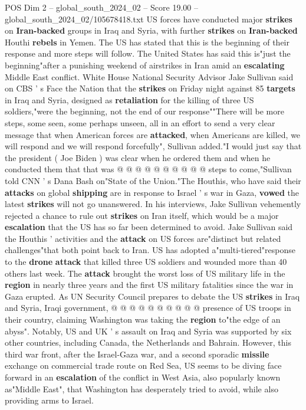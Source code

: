 \begin{textsample}{POS Dim 2 – global\_south\_2024\_02 – Score 19.00 – global\_south\_2024\_02/105678418.txt}  \label{ex:f2_pos_195}
US forces have conducted major \textbf{strikes} on \textbf{Iran-backed} groups in Iraq and Syria, with further \textbf{strikes} on \textbf{Iran-backed} Houthi \textbf{rebels} in Yemen.
The US has stated that this is the beginning of their response and more steps will follow.
The United States has said this is"just the beginning"after a punishing weekend of airstrikes in Iran amid an \textbf{escalating} Middle East conflict.
White House National Security Advisor Jake Sullivan said on CBS ' s Face the Nation that the \textbf{strikes} on Friday night against 85 \textbf{targets} in Iraq and Syria, designed as \textbf{retaliation} for the killing of three US soldiers,"were the beginning, not the end of our response""There will be more steps, some seen, some perhaps unseen, all in an effort to send a very clear message that when American forces are \textbf{attacked}, when Americans are killed, we will respond and we will respond forcefully", Sullivan added."I would just say that the president ( Joe Biden ) was clear when he ordered them and when he conducted them that that was @ @ @ @ @ @ @ @ @ @ steps to come,"Sullivan told CNN ' s Dana Bash on"State of the Union."The Houthis, who have said their \textbf{attacks} on global \textbf{shipping} are in response to Israel ' s war in Gaza, \textbf{vowed} the latest \textbf{strikes} will not go unanswered.
In his interviews, Jake Sullivan vehemently rejected a chance to rule out \textbf{strikes} on Iran itself, which would be a major \textbf{escalation} that the US has so far been determined to avoid.
Jake Sullivan said the Houthis ' activities and the \textbf{attack} on US forces are"distinct but related challenges"that both point back to Iran.
US has adopted a"multi-tiered"response to the \textbf{drone} \textbf{attack} that killed three US soldiers and wounded more than 40 others last week.
The \textbf{attack} brought the worst loss of US military life in the \textbf{region} in nearly three years and the first US military fatalities since the war in Gaza erupted.
As UN Security Council prepares to debate the US \textbf{strikes} in Iraq and Syria, Iraqi government, @ @ @ @ @ @ @ @ @ @ presence of US troops in their country, claiming Washington was taking the \textbf{region} to"the edge of an abyss".
Notably, US and UK ' s assault on Iraq and Syria was supported by six other countries, including Canada, the Netherlands and Bahrain.
However, this third war front, after the Israel-Gaza war, and a second sporadic \textbf{missile} exchange on commercial trade route on Red Sea, US seems to be diving face forward in an \textbf{escalation} of the conflict in West Asia, also popularly known as"Middle East", that Washington has desperately tried to avoid, while also providing arms to Israel.

\end{textsample}
